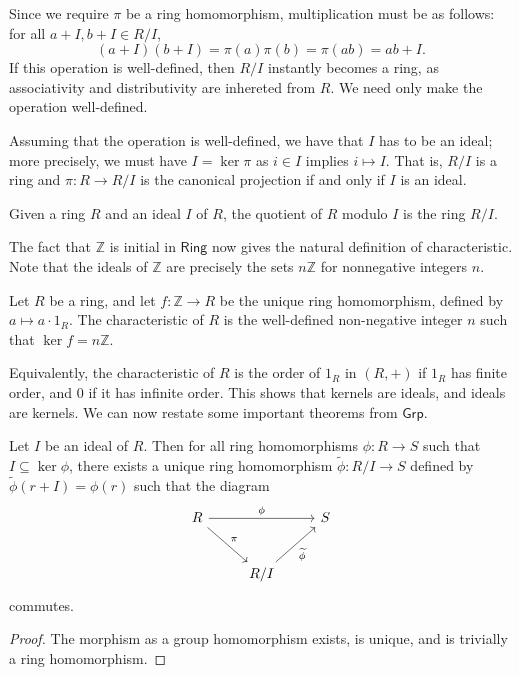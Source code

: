 Since we require $\pi $ be a ring homomorphism, multiplication must be as follows: for all $a+I,b+I\in R/I$,
\[
	(a+I)(b+I)=\pi (a)\pi (b)=\pi (ab)=ab+I
.\]
If this operation is well-defined, then $R /I$ instantly becomes a ring, as associativity and distributivity are inhereted from $R$. We need only make the operation well-defined.

Assuming that the operation is well-defined, we have that $I$ has to be an ideal; more precisely, we must have $I=\ker \pi $ as $i\in I$ implies $i\mapsto I$. That is, $R/I$ is a ring and $\pi : R \to  R /I$ is the canonical projection if and only if $I$ is an ideal.
\begin{definition}\label{dfn:3.3.2}
	Given a ring $R$ and an ideal $I$ of $R$, the quotient of $R$ modulo $I$ is the ring $R /I$.
\end{definition}

The fact that $\mathbb{Z}$ is initial in $\mathsf{Ring}$ now gives the natural definition of characteristic. Note that the ideals of $\mathbb{Z}$ are precisely the sets $n\mathbb{Z}$ for nonnegative integers $n$.
\begin{definition}[Characteristic]\label{dfn:3.3.3}
	Let $R$ be a ring, and let $f : \mathbb{Z} \to R$ be the unique ring homomorphism, defined by $a\mapsto a\cdot 1_R$. The characteristic of $R$ is the well-defined non-negative integer $n$ such that $\ker f = n\mathbb{Z}$.
\end{definition}

Equivalently, the characteristic of $R$ is the order of $1_R$ in $(R,+)$ if $1_R$ has finite order, and $0$ if it has infinite order. This shows that kernels are ideals, and ideals are kernels. We can now restate some important theorems from $\mathsf{Grp}$.
\begin{theorem}\label{thm:3.3.1}
	Let $I$ be an ideal of $R$. Then for all ring homomorphisms $\phi : R \to S$ such that $I\subseteq \ker \phi $, there exists a unique ring homomorphism $\widetilde{\phi} : R /I \to S$ defined by $\widetilde{\phi}(r+I)=\phi (r)$ such that the diagram
	\[\begin{tikzcd}[row sep=2.5em, column sep=2.5em]
		R\arrow[dr, "\pi"]\arrow[rr, "\phi "]&&S\\
						     &R /I\arrow[ru, "\widetilde{\phi} "']
	\end{tikzcd}\]
	commutes.
\end{theorem}
\begin{proof}
	The morphism as a group homomorphism exists, is unique, and is trivially a ring homomorphism.
\end{proof}

